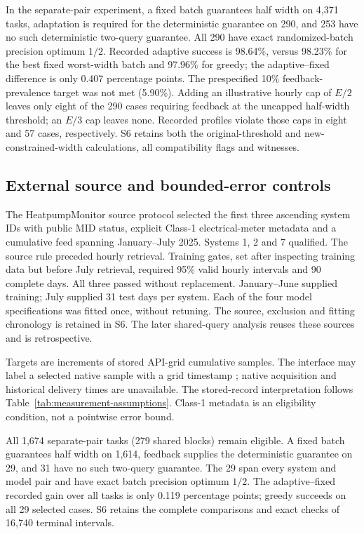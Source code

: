 In the separate-pair experiment, a fixed batch guarantees half width on
4,371 tasks, adaptation is required for the deterministic guarantee on 290,
and 253 have no such deterministic two-query guarantee. All 290 have exact
randomized-batch precision optimum $1/2$. Recorded adaptive success is
98.64\%, versus 98.23\% for the best fixed worst-width batch and 97.96\% for
greedy; the adaptive--fixed difference is only 0.407 percentage points.
The prespecified 10\% feedback-prevalence target was not met (5.90\%).
Adding an illustrative hourly cap of $E/2$ leaves only eight of the 290
cases requiring feedback at the uncapped half-width threshold; an $E/3$
cap leaves none. Recorded profiles violate those caps in eight and 57
cases, respectively. S6 retains both the original-threshold and
new-constrained-width calculations, all compatibility flags and witnesses.

\subsection{External source and bounded-error controls}
\label{sec:external-hpm:s15}
The HeatpumpMonitor source protocol \citep{hpmabout,hpmapi} selected the
first three ascending system IDs with public MID status, explicit Class-1
electrical-meter metadata and a cumulative feed spanning January--July
2025. Systems 1, 2 and 7 qualified. The source rule preceded hourly
retrieval. Training gates, set after inspecting training data but before
July retrieval, required 95\% valid hourly intervals and 90 complete days.
All three passed without replacement. January--June supplied training;
July supplied 31 test days per system. Each of the four model specifications
was fitted once, without retuning. The source, exclusion and fitting
chronology is retained in S6. The later shared-query analysis reuses these
sources and is retrospective.

Targets are increments of stored API-grid cumulative samples. The interface
may label a selected native sample with a grid timestamp \citep{hpmcode};
native acquisition and historical delivery times are unavailable. The
stored-record interpretation follows Table~\ref{tab:measurement-assumptions}.
Class-1 metadata is an eligibility condition, not a pointwise error bound.

All 1,674 separate-pair tasks (279 shared blocks) remain eligible. A fixed
batch guarantees half width on 1,614, feedback supplies the deterministic
guarantee on 29, and 31 have no such two-query guarantee. The 29 span every
system and model pair and have exact batch precision optimum $1/2$.
The adaptive--fixed recorded gain over all tasks is only 0.119 percentage
points; greedy succeeds on all 29 selected cases. S6 retains the complete
comparisons and exact checks of 16,740 terminal intervals.

